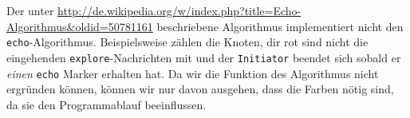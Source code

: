 Der unter
\url{http://de.wikipedia.org/w/index.php?title=Echo-Algorithmus&oldid=50781161}
beschriebene Algorithmus implementiert nicht den \verb+echo+-Algorithmus.
Beispielsweise zählen die Knoten, dir rot sind nicht die eingehenden
\verb+explore+-Nachrichten mit und der \verb+Initiator+ beendet sich sobald er
\emph{einen} \verb+echo+ Marker erhalten hat.
Da wir die Funktion des Algorithmus nicht ergründen können, können wir nur davon
ausgehen, dass die Farben nötig sind, da sie den Programmablauf beeinflussen.
